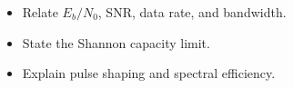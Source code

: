 \begin{objectives}
\begin{itemize}[leftmargin=1.4em,itemsep=2pt]
\item Relate $E_b/N_0$, SNR, data rate, and bandwidth.
\item State the Shannon capacity limit.
\item Explain pulse shaping and spectral efficiency.
\end{itemize}
\end{objectives}
